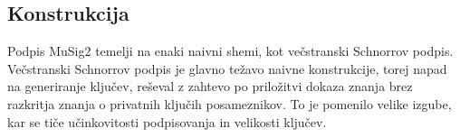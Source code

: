 \documentclass[isrm2, tisk]{fmfdelo}
\begin{document}
\subsection{Konstrukcija}
Podpis MuSig2 temelji na enaki naivni shemi, kot večstranski Schnorrov podpis. Večstranski Schnorrov
podpis je glavno težavo naivne konstrukcije, torej napad na generiranje ključev, reševal z zahtevo
po priložitvi dokaza znanja brez razkritja znanja o privatnih ključih posameznikov. To je pomenilo
velike izgube, kar se tiče učinkovitosti podpisovanja in velikosti ključev.

%
%
%
%
\end{document}

